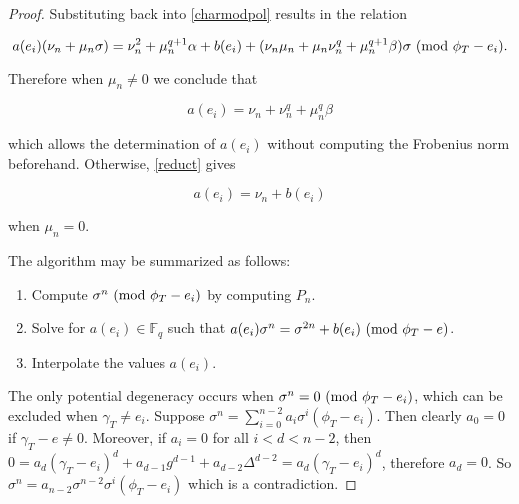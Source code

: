 \documentclass{acmart}
\theoremstyle{remark}
\numberwithin{equation}{section}
\begin{document}
\begin{proof}
\noindent Substituting back into \ref{charmodpol} results in the relation

\begin{equation} \label{reduct}
a(e_i) (\nu_n + \mu_n \sigma) = \nu_n^2 + \mu_n^{q + 1} \alpha + b(e_i) + (\nu_n \mu_n + \mu_n \nu_n^q + \mu_n^{q+1}\beta)\sigma \textnormal{ (mod } \phi_{T} - e_i \textnormal{)} .
\end{equation}

\noindent Therefore when $\mu_n \neq 0$ we conclude that

\[a(e_i) = \nu_n + \nu_n^q + \mu_n^q \beta \]

\noindent which allows the determination of $a(e_i)$ without computing the Frobenius norm beforehand. Otherwise, \ref{reduct} gives

\begin{equation}
a(e_i) = \nu_n + b(e_i)
\end{equation}

\noindent when $\mu_n = 0$.

The algorithm may be summarized as follows:

\begin{enumerate}

\item Compute $\sigma^n  \textnormal{ (mod } \phi_{T} - e_i \textnormal{)} $ by computing $P_n$.


\item Solve for $a(e_i) \in \mathbb{F}_q$ such that $a(e_i)\sigma^n = \sigma^{2n}+ b(e_i)  \textnormal{ (mod } \phi_{T} - e \textnormal{)} $.

\item Interpolate the values $a(e_i)$.

\end{enumerate}

The only potential degeneracy occurs when $\sigma^n = 0 \textnormal{ (mod } \phi_{T} - e_i \textnormal{)} $, which can be excluded when $\gamma_T \neq e_i$. Suppose $\sigma^n = \sum_{i=0}^{n-2} a_i \sigma^i(\phi_T - e_i)$. Then clearly $a_0 = 0$ if $\gamma_T - e \neq 0$. Moreover, if $a_i = 0$ for all $i < d < n - 2$, then $0 = a_{d} (\gamma_T - e_i)^d + a_{d-1}g^{d-1} + a_{d-2} \Delta^{d-2} = a_{d} (\gamma_T - e_i)^d$, therefore $a_d = 0$. So $\sigma^n = a_{n-2} \sigma^{n-2} \sigma^i(\phi_T - e_i)$ which is a contradiction.


\end{proof}
\end{document}
